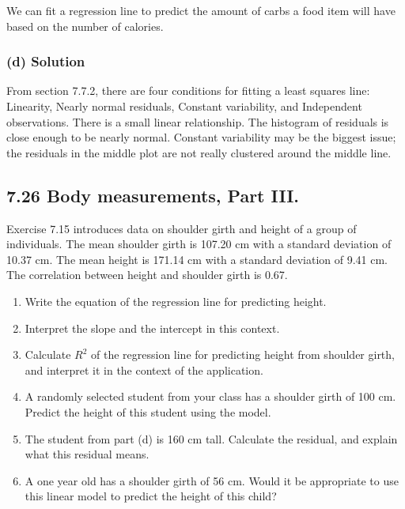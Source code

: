 \documentclass[]{article}
\providecommand{\tightlist}{%
  \setlength{\itemsep}{0pt}\setlength{\parskip}{0pt}}
\begin{document}
We can fit a regression line to predict the amount of carbs a food item
will have based on the number of calories.

\subsubsection{(d) Solution}\label{d-solution}

From section 7.7.2, there are four conditions for fitting a least
squares line: Linearity, Nearly normal residuals, Constant variability,
and Independent observations. There is a small linear relationship. The
histogram of residuals is close enough to be nearly normal. Constant
variability may be the biggest issue; the residuals in the middle plot
are not really clustered around the middle line.

\subsection{7.26 Body measurements, Part
III.}\label{body-measurements-part-iii.}

Exercise 7.15 introduces data on shoulder girth and height of a group of
individuals. The mean shoulder girth is 107.20 cm with a standard
deviation of 10.37 cm. The mean height is 171.14 cm with a standard
deviation of 9.41 cm. The correlation between height and shoulder girth
is 0.67.

\begin{enumerate}
\def\labelenumi{(\alph{enumi})}
\tightlist
\item
  Write the equation of the regression line for predicting height.\\
\item
  Interpret the slope and the intercept in this context.\\
\item
  Calculate \(R^2\) of the regression line for predicting height from
  shoulder girth, and interpret it in the context of the application.\\
\item
  A randomly selected student from your class has a shoulder girth of
  100 cm. Predict the height of this student using the model.\\
\item
  The student from part (d) is 160 cm tall. Calculate the residual, and
  explain what this residual means.\\
\item
  A one year old has a shoulder girth of 56 cm. Would it be appropriate
  to use this linear model to predict the height of this child?
\end{enumerate}
\end{document}

